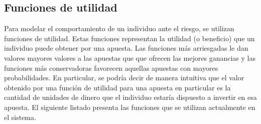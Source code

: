 \subsection{Funciones de utilidad}
Para modelar el comportamiento de un individuo ante el riesgo, se utilizan funciones de utilidad. Estas funciones representan la utilidad (o beneficio) que un individuo puede obtener por una apuesta. Las funciones más arriesgadas le dan valores mayores valores a las apuestas que que ofrecen las mejores ganancias y las funciones más conservadoras favorecen aquellas apuestas con mayores probabilidades.
En particular, se podría decir de manera intuitiva que el valor obtenido por una función de utilidad para una apuesta en particular es la cantidad de unidades de dinero que el individuo estaría dispuesto a invertir en esa apuesta.
El siguiente listado presenta las funciones que se utilizan actualmente en el sistema.
